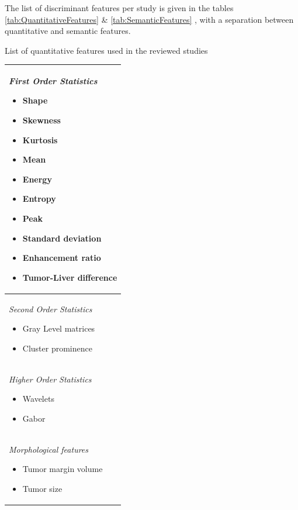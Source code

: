 \documentclass[]{article}
\renewcommand{\arraystretch}{5}
\begin{document}
The list of discriminant features per study is given in the tables \ref{tab:QuantitativeFeatures}
 \& \ref{tab:SemanticFeatures} , with a separation between quantitative and semantic features.

\renewcommand{\arraystretch}{1}
\begin{minipage}{17cm}
\begin{threeparttable} 
\caption{List of quantitative features used in the reviewed studies}
\label{tab:QuantitativeFeatures}
\begin{tabularx}{8cm}{|X|}
\hline
\emph{First Order Statistics}
\begin{itemize}
\item Shape \cite{Cozzi2017}
\item Skewness \cite{Akai2018,Li2016,Zhou2017a}
\item Kurtosis \cite{Akai2018}
\item Mean \cite{Zhou2017a,Raman2015,Cozzi2017}
\item Energy \cite{Zhou2017a,Cozzi2017}
\item Entropy \cite{Peng2018,Akai2018}
\item Peak \cite{Bakr2017}
\item Standard deviation \cite{Xia2018}
\item Enhancement ratio \cite{Taouli2017}
\item Tumor-Liver difference \cite{Taouli2017}
\end{itemize}\\
\hline
\emph{Second Order Statistics} 
\begin{itemize}
\item Gray Level matrices \cite{Peng2018,Zheng2018,Cozzi2017}
\item Cluster prominence \cite{Xia2018}
\end{itemize}\\ \hline
\emph{Higher Order Statistics}
\begin{itemize}
\item Wavelets \cite{Chen2017,Li2016,Bakr2017}
\item Gabor \cite{Chen2017,Bakr2017}
\end{itemize}\\
\hline
\emph{Morphological features}
\begin{itemize}
\item Tumor margin volume \cite{Xia2018}
\item Tumor size\tnote{1} \cite{Renzulli2016,Taouli2017}
\end{itemize}\\

\end{tabularx}
\end{threeparttable}
\end{minipage}
\end{document}
